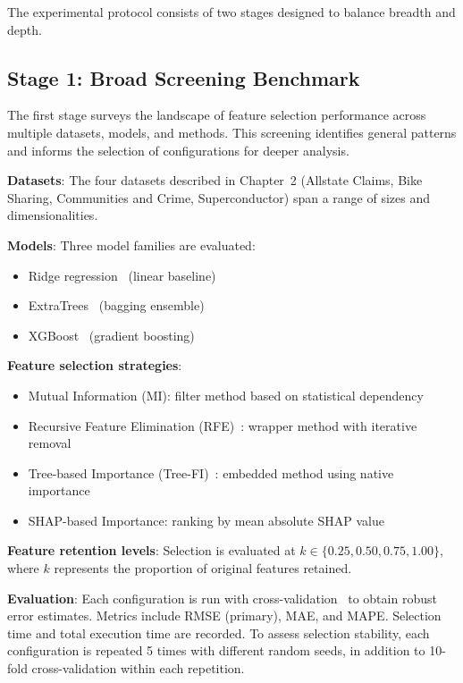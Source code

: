 The experimental protocol consists of two stages designed to balance breadth and depth.

\subsection{Stage 1: Broad Screening Benchmark}

The first stage surveys the landscape of feature selection performance across multiple datasets, models, and methods. This screening identifies general patterns and informs the selection of configurations for deeper analysis.

\textbf{Datasets}: The four datasets described in Chapter~2 (Allstate Claims, Bike Sharing, Communities and Crime, Superconductor) span a range of sizes and dimensionalities.

\textbf{Models}: Three model families are evaluated:
\begin{itemize}
    \item Ridge regression~\cite{hoerl1970ridge} (linear baseline)
    \item ExtraTrees~\cite{geurts2006extremely} (bagging ensemble)
    \item XGBoost~\cite{chen2016xgboost} (gradient boosting)
\end{itemize}

\textbf{Feature selection strategies}:
\begin{itemize}
    \item Mutual Information (MI): filter method based on statistical dependency
    \item Recursive Feature Elimination (RFE)~\cite{Guyon2002Gene}: wrapper method with iterative removal
    \item Tree-based Importance (Tree-FI)~\cite{breiman2001random}: embedded method using native importance
    \item SHAP-based Importance: ranking by mean absolute SHAP value
\end{itemize}

\textbf{Feature retention levels}: Selection is evaluated at $k \in \{0.25, 0.50, 0.75, 1.00\}$, where $k$ represents the proportion of original features retained.

\textbf{Evaluation}: Each configuration is run with cross-validation~\cite{Stone1974CrossValidatory} to obtain robust error estimates. Metrics include RMSE (primary), MAE, and MAPE. Selection time and total execution time are recorded. To assess selection stability, each configuration is repeated 5 times with different random seeds, in addition to 10-fold cross-validation within each repetition.

